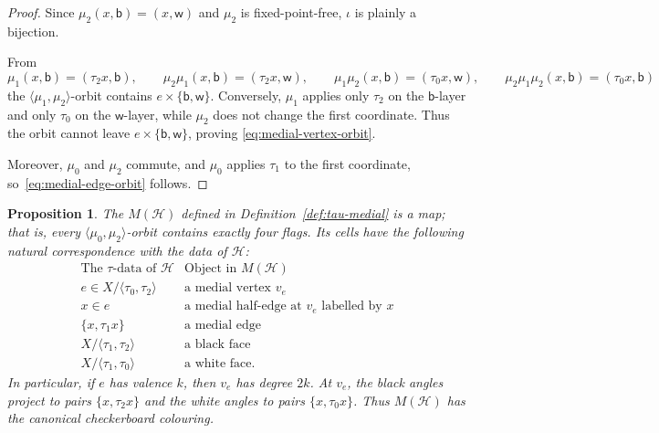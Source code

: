 \documentclass{article}
\newtheorem{proposition}[theorem]{Proposition}
\theoremstyle{definition}
\theoremstyle{remark}
\newcommand{\Hcal}{\mathcal{H}}
\begin{document}
\begin{proof}
Since $\mu_2(x,\mathsf b)=(x,\mathsf w)$ and $\mu_2$ is fixed-point-free, $\iota$ is plainly a bijection.

From
\[
 \mu_1(x,\mathsf b)=(\tau_2x,\mathsf b),\qquad\mu_2\mu_1(x,\mathsf b)=(\tau_2x,\mathsf w),\qquad
 \mu_1\mu_2(x,\mathsf b)=(\tau_0x,\mathsf w),\qquad
 \mu_2\mu_1\mu_2(x,\mathsf b)=(\tau_0x,\mathsf b)
\]
the $\langle\mu_1,\mu_2\rangle$-orbit contains $e\times\{\mathsf b,\mathsf w\}$. Conversely, $\mu_1$ applies only $\tau_2$ on the $\mathsf b$-layer and only $\tau_0$ on the $\mathsf w$-layer, while $\mu_2$ does not change the first coordinate. Thus the orbit cannot leave $e\times\{\mathsf b,\mathsf w\}$, proving
\eqref{eq:medial-vertex-orbit}.

Moreover, $\mu_0$ and $\mu_2$ commute, and $\mu_0$ applies $\tau_1$ to the first coordinate, so~\eqref{eq:medial-edge-orbit} follows.
\end{proof}

\begin{proposition}\label{prop:tau-medial}
The $M(\Hcal)$ defined in Definition~\ref{def:tau-medial} is a map; that is, every $\langle\mu_0,\mu_2\rangle$-orbit contains exactly four flags. Its cells have the following natural correspondence with the data of $\Hcal$:
\[
\begin{array}{c|c}
\text{The $\tau$-data of $\Hcal$} & \text{Object in $M(\Hcal)$}\\ \hline
 e\in X/\langle\tau_0,\tau_2\rangle & \text{a medial vertex }v_e\\
 x\in e & \text{a medial half-edge at $v_e$ labelled by $x$}\\
 \{x,\tau_1x\} & \text{a medial edge}\\
 X/\langle\tau_1,\tau_2\rangle & \text{a black face}\\
 X/\langle\tau_1,\tau_0\rangle & \text{a white face}.
\end{array}
\]
In particular, if $e$ has valence $k$, then $v_e$ has degree $2k$. At $v_e$, the black angles project to pairs $\{x,\tau_2x\}$ and the white angles to pairs $\{x,\tau_0x\}$. Thus $M(\Hcal)$ has the canonical checkerboard colouring.
\end{proposition}
\end{document}
